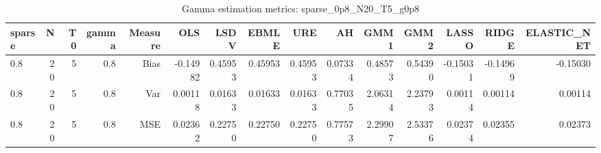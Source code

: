 \begin{table}[!htbp]\centering
\caption{Gamma estimation metrics: sparse_0p8_N20_T5_g0p8}
\label{tab:table1_sparse_0p8_N20_T5_g0p8}
\begin{tabular}{lrrrrrrrrrrrrrr}
\hline
sparse & N & T0 & gamma & Measure & OLS & LSDV & EBMLE & URE & AH & GMM1 & GMM2 & LASSO & RIDGE & ELASTIC_NET \\
\hline
0.8 & 20 & 5 & 0.8 & Bias & -0.14982 & 0.45953 & 0.45953 & 0.45953 & 0.07334 & 0.48573 & 0.54390 & -0.15031 & -0.14969 & -0.15030 \\
0.8 & 20 & 5 & 0.8 & Var & 0.00118 & 0.01633 & 0.01633 & 0.01633 & 0.77035 & 2.06314 & 2.23793 & 0.00114 & 0.00114 & 0.00114 \\
0.8 & 20 & 5 & 0.8 & MSE & 0.02362 & 0.22750 & 0.22750 & 0.22750 & 0.77573 & 2.29907 & 2.53376 & 0.02374 & 0.02355 & 0.02373 \\
\hline
\end{tabular}
\end{table}

